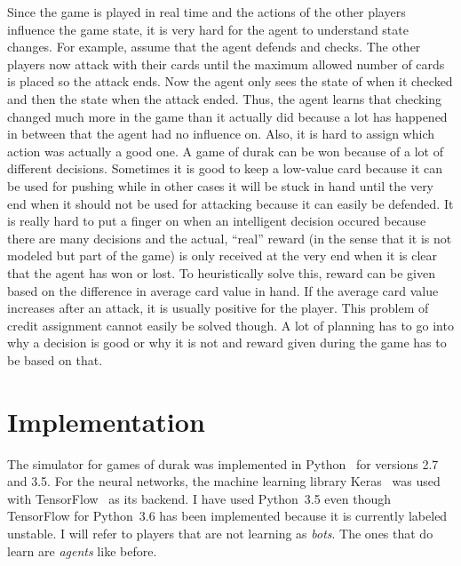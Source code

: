 \documentclass[a4paper,titlepage]{article}
\begin{document}
Since the game is played in real time and the actions of the other players influence the game state, it is very hard for the agent to understand state changes. For example, assume that the agent defends and checks. The other players now attack with their cards until the maximum allowed number of cards is placed so the attack ends. Now the agent only sees the state of when it checked and then the state when the attack ended. Thus, the agent learns that checking changed much more in the game than it actually did because a lot has happened in between that the agent had no influence on. Also, it is hard to assign which action was actually a good one. A game of durak can be won because of a lot of different decisions. Sometimes it is good to keep a low-value card because it can be used for pushing while in other cases it will be stuck in hand until the very end when it should not be used for attacking because it can easily be defended. It is really hard to put a finger on when an intelligent decision occured because there are many decisions and the actual, ``real'' reward (in the sense that it is not modeled but part of the game) is only received at the very end when it is clear that the agent has won or lost. To heuristically solve this, reward can be given based on the difference in average card value in hand. If the average card value increases after an attack, it is usually positive for the player. This problem of credit assignment cannot easily be solved though. A lot of planning has to go into why a decision is good or why it is not and reward given during the game has to be based on that.

\newpage

\section{Implementation}

The simulator for games of durak was implemented in Python~\cite{python} for versions 2.7 and 3.5. For the neural networks, the machine learning library Keras~\cite{keras} was used with {TensorFlow}~\cite{tensorflow}  as its backend. I have used Python~3.5 even though TensorFlow for Python~3.6 has been implemented because it is currently labeled unstable. I will refer to players that are not learning as \emph{bots}. The ones that do learn are \emph{agents} like before.
\end{document}
